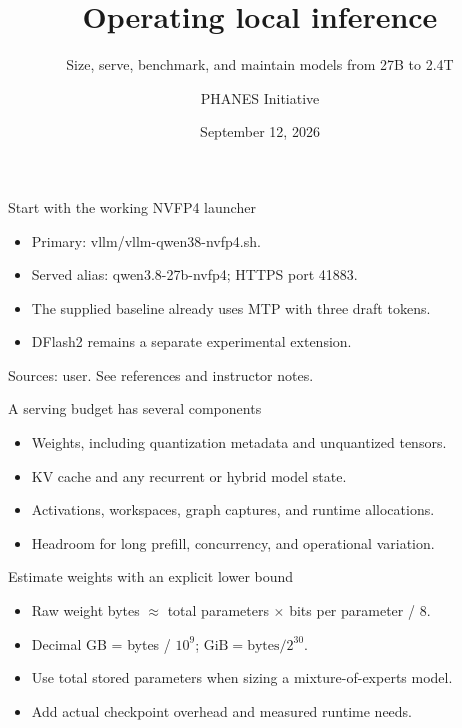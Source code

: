 \documentclass[aspectratio=169,11pt]{beamer}
\title{Operating local inference}
\subtitle{Size, serve, benchmark, and maintain models from 27B to 2.4T}
\author{PHANES Initiative}
\institute{The University of Texas at Austin}
\date{September 12, 2026}
\begin{document}
\begin{frame}[plain]
\titlepage
\end{frame}
\begin{frame}[t,fragile]{Start with the working NVFP4 launcher}
\fontsize{11.5}{14}\selectfont
\begin{itemize}\setlength{\itemsep}{2mm}
\item Primary: vllm/vllm-qwen38-nvfp4.sh.
\item Served alias: qwen3.8-27b-nvfp4; HTTPS port 41883.
\item The supplied baseline already uses MTP with three draft tokens.
\item DFlash2 remains a separate experimental extension.
\end{itemize}
\vfill{\fontsize{6.5}{8}\selectfont\color{UTgray} Sources: user. See references and instructor notes.\par}
\end{frame}
\begin{frame}[t,fragile]{A serving budget has several components}
\fontsize{11.5}{14}\selectfont
\begin{itemize}\setlength{\itemsep}{2mm}
\item Weights, including quantization metadata and unquantized tensors.
\item KV cache and any recurrent or hybrid model state.
\item Activations, workspaces, graph captures, and runtime allocations.
\item Headroom for long prefill, concurrency, and operational variation.
\end{itemize}
\end{frame}
\begin{frame}[t,fragile]{Estimate weights with an explicit lower bound}
\fontsize{11.5}{14}\selectfont
\begin{itemize}\setlength{\itemsep}{2mm}
\item Raw weight bytes $\approx$ total parameters $\times$ bits per parameter / 8.
\item Decimal GB = bytes / $10^9$; $\text{GiB} = \text{bytes} / 2^{30}$.
\item Use total stored parameters when sizing a mixture-of-experts model.
\item Add actual checkpoint overhead and measured runtime needs.
\end{itemize}
\end{frame}
\end{document}

